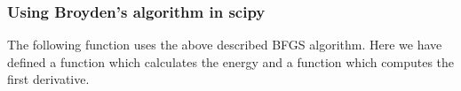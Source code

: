 \documentclass{beamer}
\begin{document}
\begin{frame}
\frametitle{Using Broyden's algorithm in scipy}

The following function uses the above described BFGS algorithm. Here we have defined a function which calculates the energy and a function which computes the first derivative.











































































































\end{frame}
\end{document}
